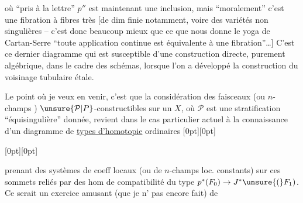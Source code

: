 %
où ``pris à la lettre'' $p''$ est maintenant une inclusion, mais
``moralement'' c'est  une fibration à fibres très
 [de dim finie notamment, voire des variétés
non singulières -- c'est donc beaucoup mieux que ce que nous donne
le yoga de Cartan-Serre ``toute application continue est équivalente
à une fibration''\ldots] C'est ce dernier diagramme qui est susceptible
d'une construction directe, purement algébrique, dans le cadre des
schémas, lorsque l'on a développé la construction du voisinage tubulaire étale.

Le point où je veux en venir, c'est que la considération
 des faisceaux (ou 
$n$-champs ) $\unsure{\mathcal P|P}$-constructibles
sur un $X$, où $\mathcal P$ est une stratification ``équisingulière''
donnée, revient dans le cas particulier actuel à la connaissance d'un
diagramme de \uline{types d'homotopie} ordinaires
%
\raisebox{1.1ex}[0pt][0pt]{\parbox{0pt}{}}
\noindent\raisebox{0pt}[0pt][0pt]{\parbox{0pt}{}}%
 prenant des systèmes de coeff locaux (ou de $n$-champs
loc. constants) sur ces sommets
reliés par des hom de compatibilité du type
$p^*(F_0)\to J^*\unsure{(}F_1)$. Ce serait un exercice amusant
(que je n' pas encore fait) de
